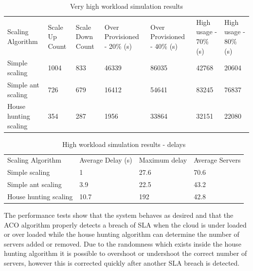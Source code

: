 \documentclass[conference]{IEEEtran}
\begin{document}
\begin{table}
\caption{Very high workload simulation results}
\label{table:sim3}
\begin{tabu} to\linewidth{|X[c]|X[c]|X[c]|X[c]|X[c]|X[c]|X[c]|}
\everyrow{\hline}
\hline
Scaling Algorithm & Scale Up Count & Scale Down Count & Over Provisioned - 20\% (s) & Over Provisioned - 40\% (s) & High usage - 70\% (s) & High usage - 80\% (s) \\
Simple scaling & 1004 & 833 & 46339 & 86035 & 42768 & 20604 \\
Simple ant scaling & 726 & 679 & 16412 & 54641 & 83245 & 76837 \\
House hunting scaling & 354 & 287 & 1956 & 33864 & 32151 & 22080 \\
\end{tabu}
\end{table}

\begin{table}
\caption{High workload simulation results - delays}
\label{table:sim3-delay}
\begin{tabu} to\linewidth{|X[c]|X[c]|X[c]|X[c]|}
\everyrow{\hline}
\hline
Scaling Algorithm & Average Delay (s) & Maximum delay & Average Servers  \\
Simple scaling & 1 & 27.6 & 70.6 \\
Simple ant scaling & 3.9 & 22.5 & 43.2 \\
House hunting scaling & 10.7 & 192 & 42.8 \\
\end{tabu}
\end{table}

The performance tests show that the system behaves as desired and that the ACO algorithm properly detects a breach of SLA when the cloud is under loaded or over loaded while the house hunting algorithm can determine the number of servers added or removed. Due to the randomness which exists inside the house hunting algorithm it is possible to overshoot or undershoot the correct number of servers, however this is corrected quickly after another SLA breach is detected.

%
%
\end{document}
